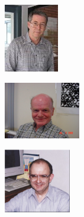 \begin{frame}[fragile,label=OSTheorem]{}
\vskip2mm
\hskip3mm
\includegraphics[height=30mm]{aux/Aschbacher3}
\begin{center}
\includegraphics[height=25mm]{aux/ONan}
\end{center}
\hfill    
\includegraphics[height=28mm]{aux/Scott}

\end{frame}


